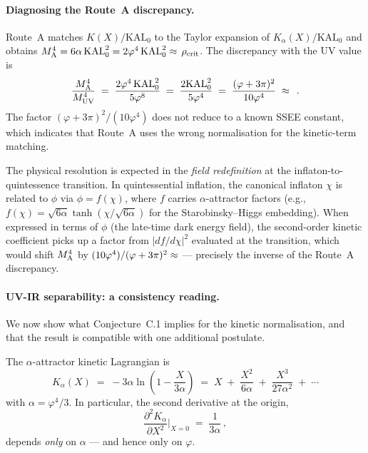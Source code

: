 \documentclass[12pt,a4paper]{article}
\newcommand{\phiG}{\varphi}
\newcommand{\KAL}{\mathrm{KAL}_0}
\newcommand{\rhoc}{\rho_{\rm crit}}
\begin{document}
\paragraph{Diagnosing the Route~A discrepancy.}
Route~A matches $K(X)/\KAL$ to the Taylor expansion of $K_\alpha(X)/\KAL$
and obtains $M^4_{\rm A} = 6\alpha\,\KAL^2 = 2\phiG^4\,\KAL^2 \approx \val{seis_alfa_KAL2_d0}\,\rhoc$.
The discrepancy with the UV value is
\begin{equation}
  \frac{M^4_{\rm A}}{M^4_{\rm UV}}
  \;=\; \frac{2\phiG^4\,\KAL^2}{5\phiG^8}
  \;=\; \frac{2\KAL^2}{5\phiG^4}
  \;=\; \frac{(\phiG+3\pi)^2}{10\phiG^4}
  \;\approx\; \val{KAL_KALeff2_d3}\,.
  \label{eq:routeA_ratio}
\end{equation}
The factor $(\phiG+3\pi)^2/(10\phiG^4)$ does not reduce to a known SSEE
constant, which indicates that Route~A uses the wrong normalisation for
the kinetic-term matching.

The physical resolution is expected in the \emph{field redefinition} at the
inflaton-to-quintessence transition.
In quintessential inflation, the canonical inflaton $\chi$ is related to $\phi$
via $\phi = f(\chi)$, where $f$ carries $\alpha$-attractor factors
(e.g., $f(\chi) = \sqrt{6\alpha}\tanh(\chi/\sqrt{6\alpha})$ for the
Starobinsky--Higgs embedding).
When expressed in terms of $\phi$ (the late-time dark energy field), the
second-order kinetic coefficient picks up a factor from $|df/d\chi|^2$
evaluated at the transition, which would shift $M^4_{\rm A}$ by
$(10\phiG^4)/(\phiG+3\pi)^2 \approx \val{KALeff2_sobre_KAL2_d3}$ --- precisely the inverse of
the Route~A discrepancy.

\paragraph{UV-IR separability: a consistency reading.}

We now show what Conjecture~C.1 implies for the kinetic normalisation, and
that the result is compatible with one additional postulate.

The $\alpha$-attractor kinetic Lagrangian is
\begin{equation}
  K_\alpha(X) \;=\; -3\alpha\ln\!\!\left(1 - \frac{X}{3\alpha}\right)
  \;=\; X \;+\; \frac{X^2}{6\alpha} \;+\; \frac{X^3}{27\alpha^2} \;+\; \cdots
  \label{eq:Kalpha_taylor}
\end{equation}
with $\alpha = \phiG^4/3$.
In particular, the second derivative at the origin,
\begin{equation}
  \frac{\partial^2 K_\alpha}{\partial X^2}\bigg|_{X=0} \;=\; \frac{1}{3\alpha}\,,
  \label{eq:Kalpha_XX}
\end{equation}
depends \emph{only} on $\alpha$ --- and hence only on $\phiG$.
\end{document}
